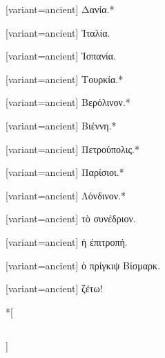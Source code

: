 \switchcolumn*
{}%
\switchcolumn
\begin{greek}[variant=ancient]%
Δανία.{*}%
\end{greek}%
\switchcolumn*
{}%
\switchcolumn
\begin{greek}[variant=ancient]%
Ἰταλία.%
\end{greek}%
\switchcolumn*
{}%
\switchcolumn
\begin{greek}[variant=ancient]%
Ἱσπανία.%
\end{greek}%
\switchcolumn*
{}%
\switchcolumn
\begin{greek}[variant=ancient]%
Τουρκία.{*}%
\end{greek}%
\switchcolumn*
{}%
\switchcolumn
\begin{greek}[variant=ancient]%
Βερόλινον.{*}%
\end{greek}%
\switchcolumn*
{}%
\switchcolumn
\begin{greek}[variant=ancient]%
Βιέννη.{*}%
\end{greek}%
\switchcolumn*
{}%
\switchcolumn
\begin{greek}[variant=ancient]%
Πετρούπολις.{*}%
\end{greek}%
\switchcolumn*
{}%
\switchcolumn
\begin{greek}[variant=ancient]%
Παρίσιοι.{*}%
\end{greek}%
\switchcolumn*
{}%
\switchcolumn
\begin{greek}[variant=ancient]%
Λόνδινον.{*}%
\end{greek}%
\switchcolumn*
{}%
\switchcolumn
\begin{greek}[variant=ancient]%
τὸ συνέδριον.%
\end{greek}%
\switchcolumn*
{}%
\switchcolumn
\begin{greek}[variant=ancient]%
ἡ ἐπιτροπή.%
\end{greek}%
\switchcolumn*
{}%
\switchcolumn
\begin{greek}[variant=ancient]%
ὁ πρίγκιψ Βίσμαρκ.%
\end{greek}%
\switchcolumn*
{}%
\switchcolumn
\begin{greek}[variant=ancient]%
ζέτω!%
\end{greek}%
\switchcolumn*
\switchcolumn[0]*[{\subsection*{%
%
}}]
